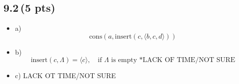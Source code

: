 \documentclass[12pt]{article}
\begin{document}
\subsection*{9.2\,(5 pts)}
\begin{itemize}
    \item a)
    \begin{equation*}
    \text{cons}(a, \text{insert}(c, \langle b, c, d \rangle))
    \end{equation*}
    \item b)
    \begin{equation*}
    \text{insert}(c, \Lambda) = \langle c \rangle, \quad \text{if } \Lambda \text{ is empty}
    \text{  *LACK OF TIME/NOT SURE}
    \end{equation*}

    \item c) LACK OT TIME/NOT SURE
\end{itemize}

\newpage
\end{document}
